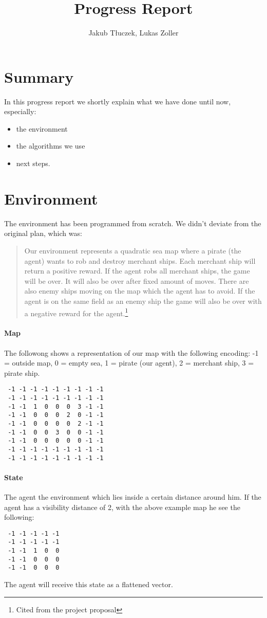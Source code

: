 \documentclass[11pt]{article} %
\title{Progress Report}
\author{Jakub Tłuczek, Lukas Zoller}
\begin{document}
\maketitle

\section{Summary}
In this progress report we shortly explain what we have done until now, especially: 
\begin{itemize}
	\item the environment
	\item the algorithms we use
	\item next steps.
\end{itemize}

\section{Environment}
The environment has been programmed from scratch. We didn't deviate from the original plan, which was:


\begin{quote}
Our environment represents a quadratic sea map where a pirate (the agent) wants to rob and destroy merchant ships. Each merchant ship will return a positive reward. If the agent robs all merchant ships, the game will be over. It will also be over after fixed amount of moves. There are also enemy ships moving on the map which the agent has to avoid. If the agent is on the same field as an enemy ship the game will also be over with a negative reward for the agent.\footnote{Cited from the project proposal}
\end{quote}

\paragraph{Map}
The followong shows a representation of our map with the following encoding: -1 = outside map, 0 = empty sea, 1 = pirate (our agent), 2 = merchant ship, 3 = pirate ship.

\begin{verbatim}
 -1 -1 -1 -1 -1 -1 -1 -1 -1
 -1 -1 -1 -1 -1 -1 -1 -1 -1
 -1 -1  1  0  0  0  3 -1 -1
 -1 -1  0  0  0  2  0 -1 -1
 -1 -1  0  0  0  0  2 -1 -1
 -1 -1  0  0  3  0  0 -1 -1
 -1 -1  0  0  0  0  0 -1 -1
 -1 -1 -1 -1 -1 -1 -1 -1 -1
 -1 -1 -1 -1 -1 -1 -1 -1 -1
\end{verbatim}

\paragraph{State}
The agent  the environment which lies inside a certain distance around him. If the agent has a visibility distance of 2, with the above example map he see the following:
 \begin{verbatim}
 -1 -1 -1 -1 -1 
 -1 -1 -1 -1 -1 
 -1 -1  1  0  0 
 -1 -1  0  0  0  
 -1 -1  0  0  0 
\end{verbatim}
The agent will receive this state as a flattened vector.
\end{document}
